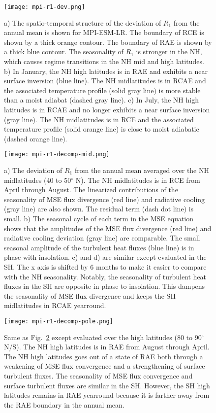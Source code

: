 \documentclass{ametsocV5}
\begin{document}
\begin{figure}[t]
  \noindent\texttt{[image: mpi-r1-dev.png]}\\
  \caption{a) The spatio-temporal structure of the deviation of \(R_{1}\) from the annual mean is shown for MPI-ESM-LR. The boundary of RCE is shown by a thick orange contour. The boundary of RAE is shown by a thick blue contour. The seasonality of \(R_{1}\) is stronger in the NH, which causes regime transitions in the NH mid and high latitudes. b) In January, the NH high latitudes is in RAE and exhibits a near surface inversion (blue line). The NH midlatitudes is in RCAE and the associated temperature profile (solid gray line) is more stable than a moist adiabat (dashed gray line). c) In July, the NH high latitudes is in RCAE and no longer exhibits a near surface inversion (gray line). The NH midlatitudes is in RCE and the associated temperature profile (solid orange line) is close to moist adiabatic (dashed orange line).}
  \label{fig:mpi-r1-dev}
\end{figure}

\begin{figure}[t]
  \noindent\texttt{[image: mpi-r1-decomp-mid.png]}\\
  \caption{a) The deviation of \(R_{1}\) from the annual mean averaged over the NH midlatitudes (40 to 50$^{\circ}$ N). The NH midlatitudes is in RCE from April through August. The linearized contributions of the seasonality of MSE flux divergence (red line) and radiative cooling (gray line) are also shown. The residual term (dash dot line) is small. b) The seasonal cycle of each term in the MSE equation shows that the amplitudes of the MSE flux divergence (red line) and radiative cooling deviation (gray line) are comparable. The small seasonal amplitude of the turbulent heat fluxes (blue line) is in phase with insolation. c) and d) are similar except evaluated in the SH. The x axis is shifted by 6 months to make it easier to compare with the NH seasonality. Notably, the seasonality of turbulent heat fluxes in the SH are opposite in phase to insolation. This dampens the seasonality of MSE flux divergence and keeps the SH midlatitudes in RCAE yearround.}
  \label{fig:mpi-r1-decomp-mid}
\end{figure}

\begin{figure}[t]
  \noindent\texttt{[image: mpi-r1-decomp-pole.png]}\\
  \caption{Same as Fig.~\ref{fig:mpi-r1-decomp-mid} except evaluated over the high latitudes (80 to 90$^{\circ}$ N/S). The NH high latitudes is in RAE from August through April. The NH high latitudes goes out of a state of RAE both through a weakening of MSE flux convergence and a strengthening of surface turbulent fluxes. The seasonality of MSE flux convergence and surface turbulent fluxes are similar in the SH. However, the SH high latitudes remains in RAE yearround because it is farther away from the RAE boundary in the annual mean.}
  \label{fig:mpi-r1-decomp-pole}
\end{figure}
\end{document}
